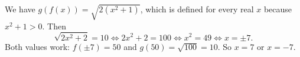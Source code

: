We have $g(f(x))=\sqrt{2(x^2+1)}$, which is defined for every real $x$ because $x^2+1>0$. Then
\[
\sqrt{2x^2+2}=10\iff 2x^2+2=100\iff x^2=49\iff x=\pm7 .
\]
Both values work: $f(\pm7)=50$ and $g(50)=\sqrt{100}=10$. So $\boxed{x=7\text{ or }x=-7}$.
